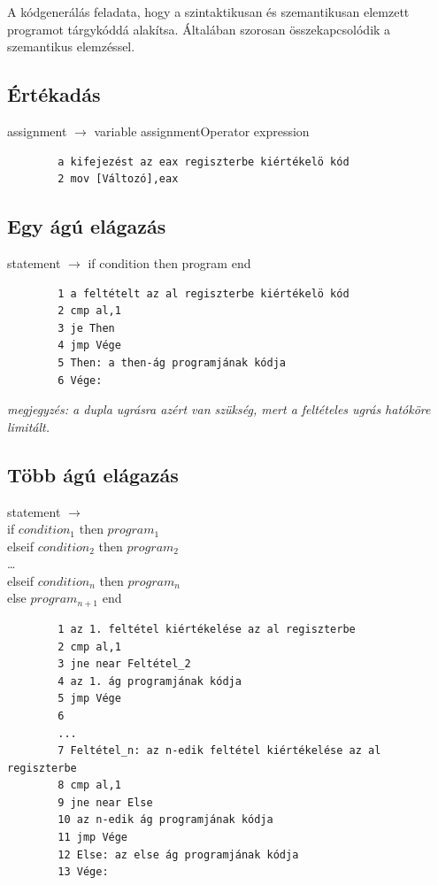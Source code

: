 \documentclass[margin=0px]{article}
\begin{document}
	A kódgenerálás feladata, hogy a szintaktikusan és szemantikusan elemzett programot tárgykóddá alakítsa. Általában szorosan összekapcsolódik a
	szemantikus elemzéssel. 
	
\subsection{Értékadás}
	
	assignment $ \rightarrow $ variable assignmentOperator expression

	\begin{verbatim}
		a kifejezést az eax regiszterbe kiértékelö kód
		2 mov [Változó],eax
	\end{verbatim}
	
\subsection{Egy ágú elágazás}
	statement $ \rightarrow $ if condition then program end
	
	\begin{verbatim}
		1 a feltételt az al regiszterbe kiértékelö kód
		2 cmp al,1
		3 je Then
		4 jmp Vége
		5 Then: a then-ág programjának kódja
		6 Vége:
	\end{verbatim}
	
	\textit{megjegyzés: a dupla ugrásra azért van szükség, mert a feltételes ugrás hatóköre limitált.}

\subsection{Több ágú elágazás}

	
	statement $ \rightarrow $ 
	\\if $ condition_1 $ then $ program_1 $ 
	\\elseif $ condition_2 $ then $ program_2 $ 
	\\\dots
	\\elseif $ condition_n $ then $ program_n $
	\\else $ program_{n+1} $ end
	
	\begin{verbatim}
		1 az 1. feltétel kiértékelése az al regiszterbe
		2 cmp al,1
		3 jne near Feltétel_2
		4 az 1. ág programjának kódja
		5 jmp Vége
		6
		...
		7 Feltétel_n: az n-edik feltétel kiértékelése az al regiszterbe
		8 cmp al,1
		9 jne near Else
		10 az n-edik ág programjának kódja
		11 jmp Vége
		12 Else: az else ág programjának kódja
		13 Vége:
	\end{verbatim}
\end{document}
